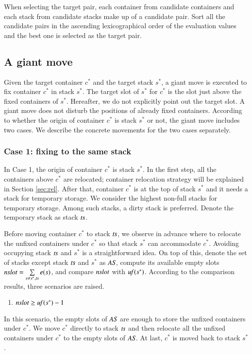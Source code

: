 \documentclass[review,3p,times,authoryear,12pt]{elsarticle}
\begin{document}
When selecting the target pair, each container from candidate containers and each stack from candidate stacks make up of a candidate pair. Sort all the candidate pairs in the ascending lexicographical order of the evaluation values and the best one is selected as the target pair.

\subsection{A giant move}

Given the target container $c^*$ and the target stack $s^*$, a giant move is executed to fix container $c^*$ in stack $s^*$. The target slot of $s^*$ for $c^*$ is the slot just above the fixed containers of $s^*$. Hereafter, we do not explicitly point out the target slot.
A giant move does not disturb the positions of already fixed containers. According to whether the origin of container $c^*$ is stack $s^*$ or not, the giant move includes two cases. We describe the concrete movements for the two cases separately.

\subsubsection{Case 1: fixing to the same stack}

In Case 1, the origin of container $c^*$ is stack $s^*$. In the first step, all the containers above $c^*$ are relocated; container relocation strategy will be explained in Section \ref{sec:rel}. After that, container $c^*$ is at the top of stack $s^*$ and it needs a stack for temporary storage. We consider the highest non-full stacks for temporary storage. Among such stacks, a dirty stack is preferred. Denote the temporary stack as stack $\id{ts}$.

Before moving container $c^*$ to stack $\id{ts}$, we observe in advance where to relocate the unfixed containers under $c^*$ so that stack $s^*$ can accommodate $c^*$. Avoiding occupying stack $\id{ts}$ and $s^*$ is a straightforward idea. On top of this, denote the set of stacks except stack $\id{ts}$ and $s^*$ as $\id{AS}$, compute its available empty slots $\id{nslot} = \sum\limits_{s\neq s^*, \id{ts}}e(s)$, and compare $\id{nslot}$ with $\id{uf}(s^*)$. According to the comparison results, three scenarios are raised.

\begin{enumerate}
\setcounter{enumi}{0}
\item $\id{nslot}\ge \id{uf}(s^*)-1$
\end{enumerate}
In this scenario, the empty slots of $\id{AS}$ are enough to store the unfixed containers under $c^*$. We move $c^*$ directly to stack $\id{ts}$ and then relocate all the unfixed containers under $c^*$ to the empty slots of $\id{AS}$. At last, $c^*$ is moved back to stack $s^*$.
\end{document}
